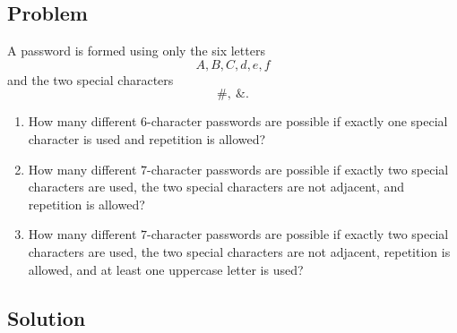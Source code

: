 \documentclass[12pt]{article}
\begin{document}
\subsection{Problem}

A password is formed using only the six letters
\[
A,B,C,d,e,f
\]
and the two special characters
\[
\#,\ \&.
\]

\begin{enumerate}[label=(\alph*)]
    \item How many different $6$-character passwords are possible if exactly one special character is used and repetition is allowed?
    \item How many different $7$-character passwords are possible if exactly two special characters are used, the two special characters are not adjacent, and repetition is allowed?
    \item How many different $7$-character passwords are possible if exactly two special characters are used, the two special characters are not adjacent, repetition is allowed, and at least one uppercase letter is used?
\end{enumerate}

\subsection{Solution}
\end{document}
